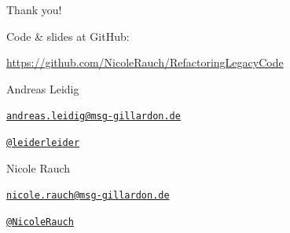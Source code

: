{
\begin{frame}{Thank you!}

        Code \& slides at GitHub:
        \begin{center}
                \url{https://github.com/NicoleRauch/RefactoringLegacyCode}
        \end{center}

        \begin{block}{Andreas Leidig}
        \begin{description}[Twitterxx]
                \item[E-Mail]  \href{mailto:andreas.leidig@msg-gillardon.de}{\texttt{andreas.leidig@msg-gillardon.de}}
                \item[Twitter] \href{http://twitter.com/leiderleider}{\texttt{@leiderleider}}
        \end{description}
        \end{block}

        \begin{block}{Nicole Rauch}
        \begin{description}[Twitterxx]
                \item[E-Mail]  \href{mailto:nicole.rauch@msg-gillardon.de}{\texttt{nicole.rauch@msg-gillardon.de}}
                \item[Twitter] \href{http://twitter.com/NicoleRauch}{\texttt{@NicoleRauch}}
        \end{description}
        \end{block}
\end{frame}
}
